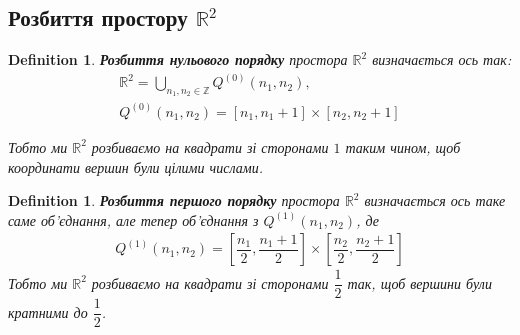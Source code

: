 \documentclass[a4paper, 10pt]{article}
\theoremstyle{theoremdd}
\theoremstyle{theoremdd}
\newtheorem{definition}[theorem]{Definition}
\theoremstyle{theoremdd}
\theoremstyle{theoremdd}
\theoremstyle{theoremdd}
\theoremstyle{theoremdd}
\theoremstyle{theoremdd}
\theoremstyle{theoremdd}
\begin{document}
\subsection{Розбиття простору $\mathbb{R}^2$}
\begin{definition}
\textbf{Розбиття нульового порядку} простора $\mathbb{R}^2$ визначається ось так:
\begin{align*}
\mathbb{R}^2 = \bigcup_{n_1,n_2 \in \mathbb{Z}} Q^{(0)}(n_1,n_2), \\
Q^{(0)}(n_1,n_2) = [n_1,n_1+1] \times [n_2,n_2+1]
\end{align*}

Тобто ми $\mathbb{R}^2$ розбиваємо на квадрати зі сторонами $1$ таким чином, щоб координати вершин були цілими числами.
\end{definition}

\begin{figure}[H]
\centering
{}
\end{figure}

\begin{definition}
\textbf{Розбиття першого порядку} простора $\mathbb{R}^2$ визначається ось таке саме об'єднання, але тепер об'єднання з $Q^{(1)}(n_1,n_2)$, де
\begin{align*}
Q^{(1)}(n_1,n_2) = \left[ \dfrac{n_1}{2}, \dfrac{n_1+1}{2} \right] \times \left[ \dfrac{n_2}{2}, \dfrac{n_2+1}{2} \right]
\iffalse Q^{(1)} = \left\{ (x,y): x \in \left[\dfrac{n_1}{2},\dfrac{n_1+1}{2} \right], \hspace{0.5cm} y \in \left[\dfrac{n_2}{2},\dfrac{n_2+1}{2} \right] \right\}
\fi
\end{align*}
Тобто ми $\mathbb{R}^2$ розбиваємо на квадрати зі сторонами $\dfrac{1}{2}$ так, щоб вершини були кратними до $\dfrac{1}{2}$.
\end{definition}

\begin{figure}[H]
\centering
{}
\end{figure}
\end{document}
